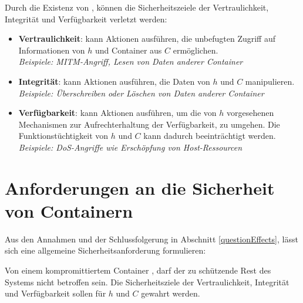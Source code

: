 \documentclass[../main.tex]{subfiles}
\begin{document}


    Durch die Existenz von \cbroken{}, können die Sicherheitszeiele der Vertraulichkeit, Integrität und Verfügbarkeit verletzt werden:

    \begin{itemize}
      \item \textbf{Vertraulichkeit}: \cbroken{} kann Aktionen ausführen, die unbefugten Zugriff auf Informationen von \(h\) und Container aus \(C\) ermöglichen.\\
      \emph{Beispiele: MITM-Angriff, Lesen von Daten anderer Container}
      \item \textbf{Integrität}: \cbroken{} kann Aktionen ausführen, die Daten von \(h\) und \(C\) manipulieren.\\
      \emph{Beispiele: Überschreiben oder Löschen von Daten anderer Container}
      \item \textbf{Verfügbarkeit}: \cbroken{} kann Aktionen ausführen, um die von \(h\) vorgesehenen Mechanismen zur Aufrechterhaltung der Verfügbarkeit, zu umgehen. Die Funktionstüchtigkeit von \(h\) und \(C\) kann dadurch beeinträchtigt werden.\\
      \emph{Beispiele: DoS-Angriffe wie Erschöpfung von Host-Ressourcen}
    \end{itemize}


  \section{Anforderungen an die Sicherheit von Containern}
    Aus den Annahmen und der Schlussfolgerung in Abschnitt \ref{questionEffects}, lässt sich eine allgemeine Sicherheitsanforderung formulieren:

    Von einem kompromittiertem Container \cbroken{}, darf der zu schützende Rest des Systems nicht betroffen sein. Die Sicherheitsziele der Vertraulichkeit, Integrität und Verfügbarkeit sollen für \(h\) und \(C\) gewahrt werden.
\end{document}
